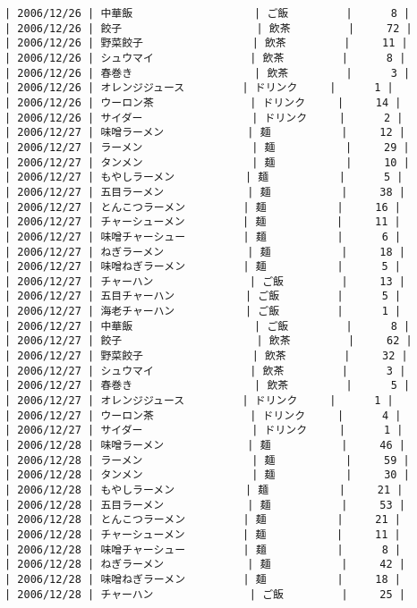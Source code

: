 \documentclass{jlreq}
\begin{document}
\begin{enumerate}
\begin{lstlisting}
| 2006/12/26 | 中華飯                   | ご飯         |      8 |
| 2006/12/26 | 餃子                     | 飲茶         |     72 |
| 2006/12/26 | 野菜餃子                 | 飲茶         |     11 |
| 2006/12/26 | シュウマイ               | 飲茶         |      8 |
| 2006/12/26 | 春巻き                   | 飲茶         |      3 |
| 2006/12/26 | オレンジジュース         | ドリンク     |      1 |
| 2006/12/26 | ウーロン茶               | ドリンク     |     14 |
| 2006/12/26 | サイダー                 | ドリンク     |      2 |
| 2006/12/27 | 味噌ラーメン             | 麺           |     12 |
| 2006/12/27 | ラーメン                 | 麺           |     29 |
| 2006/12/27 | タンメン                 | 麺           |     10 |
| 2006/12/27 | もやしラーメン           | 麺           |      5 |
| 2006/12/27 | 五目ラーメン             | 麺           |     38 |
| 2006/12/27 | とんこつラーメン         | 麺           |     16 |
| 2006/12/27 | チャーシューメン         | 麺           |     11 |
| 2006/12/27 | 味噌チャーシュー         | 麺           |      6 |
| 2006/12/27 | ねぎラーメン             | 麺           |     18 |
| 2006/12/27 | 味噌ねぎラーメン         | 麺           |      5 |
| 2006/12/27 | チャーハン               | ご飯         |     13 |
| 2006/12/27 | 五目チャーハン           | ご飯         |      5 |
| 2006/12/27 | 海老チャーハン           | ご飯         |      1 |
| 2006/12/27 | 中華飯                   | ご飯         |      8 |
| 2006/12/27 | 餃子                     | 飲茶         |     62 |
| 2006/12/27 | 野菜餃子                 | 飲茶         |     32 |
| 2006/12/27 | シュウマイ               | 飲茶         |      3 |
| 2006/12/27 | 春巻き                   | 飲茶         |      5 |
| 2006/12/27 | オレンジジュース         | ドリンク     |      1 |
| 2006/12/27 | ウーロン茶               | ドリンク     |      4 |
| 2006/12/27 | サイダー                 | ドリンク     |      1 |
| 2006/12/28 | 味噌ラーメン             | 麺           |     46 |
| 2006/12/28 | ラーメン                 | 麺           |     59 |
| 2006/12/28 | タンメン                 | 麺           |     30 |
| 2006/12/28 | もやしラーメン           | 麺           |     21 |
| 2006/12/28 | 五目ラーメン             | 麺           |     53 |
| 2006/12/28 | とんこつラーメン         | 麺           |     21 |
| 2006/12/28 | チャーシューメン         | 麺           |     11 |
| 2006/12/28 | 味噌チャーシュー         | 麺           |      8 |
| 2006/12/28 | ねぎラーメン             | 麺           |     42 |
| 2006/12/28 | 味噌ねぎラーメン         | 麺           |     18 |
| 2006/12/28 | チャーハン               | ご飯         |     25 |

\end{lstlisting}
\end{enumerate}
\end{document}

